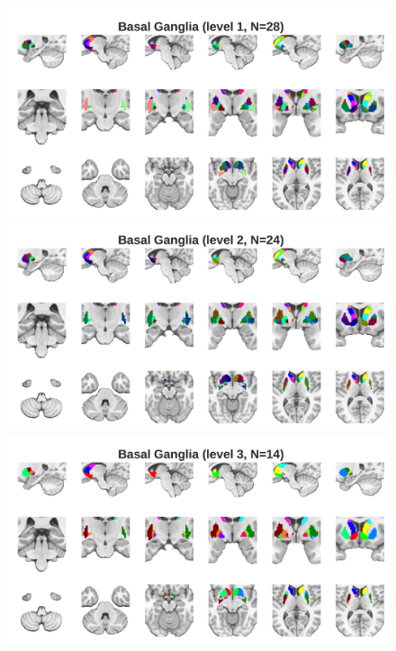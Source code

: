 \documentclass[10pt,letterpaper]{article}
\begin{document}
\begin{figure}[t]
\centering
\begin{minipage}{\linewidth}
\includegraphics[width=\linewidth]{images/bg_fine.png}
\end{minipage}
\begin{minipage}{\linewidth}
\includegraphics[width=\linewidth]{images/bg_coarse.png}
\end{minipage}
\begin{minipage}{\linewidth}
\includegraphics[width=\linewidth]{images/bg_coarser.png}

\end{minipage}
\end{figure}
\end{document}
